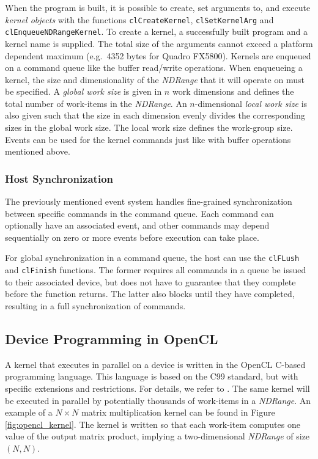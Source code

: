 		When the program is built, it is possible to create, set arguments to, and execute \emph{kernel objects} with the functions \texttt{clCreateKernel}, \texttt{clSetKernelArg} and \texttt{clEnqueueNDRangeKernel}. To create a kernel, a successfully built program and a kernel name is supplied. The total size of the arguments cannot exceed a platform dependent maximum (e.g.\ 4352 bytes for Quadro FX5800). Kernels are enqueued on a command queue like the buffer read/write operations. When enqueueing a kernel, the size and dimensionality of the \textit{NDRange} that it will operate on must be specified. A \emph{global work size} is given in $n$ work dimensions and defines the total number of work-items in the \textit{NDRange}. An $n$-dimensional \emph{local work size} is also given such that the size in each dimension evenly divides the corresponding sizes in the global work size. The local work size defines the work-group size. Events can be used for the kernel commands just like with buffer operations mentioned above.
	
	\subsubsection{Host Synchronization}
	
		The previously mentioned event system handles fine-grained synchronization between specific commands in the command queue. Each command can optionally have an associated event, and other commands may depend sequentially on zero or more events before execution can take place.
		
		For global synchronization in a command queue, the host can use the \texttt{clFLush} and \texttt{clFinish} functions. The former requires all commands in a queue be issued to their associated device, but does not have to guarantee that they complete before the function returns. The latter also blocks until they have completed, resulting in a full synchronization of commands.

\subsection{Device Programming in OpenCL}

	A kernel that executes in parallel on a device is written in the OpenCL C-based programming language. This language is based on the C99 standard, but with specific extensions and restrictions. For details, we refer to \cite{openclspec}. The same kernel will be executed in parallel by potentially thousands of work-items in a \textit{NDRange}. An example of a $N \times N$ matrix multiplication kernel can be found in Figure \ref{fig:opencl_kernel}. The kernel is written so that each work-item computes one value of the output matrix product, implying a two-dimensional \textit{NDRange} of size $(N, N)$.
	
